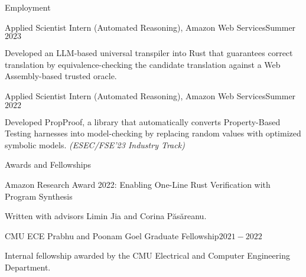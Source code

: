 \documentclass{resume} %
\begin{document}
\begin{rSection}{Employment}

  \begin{rSubsection}{Applied Scientist Intern (Automated Reasoning),
      Amazon Web Services}{Summer $2023$} {}{}
  \item Developed an LLM-based universal transpiler into Rust that
    guarantees correct translation by equivalence-checking the
    candidate translation against a Web Assembly-based trusted oracle.
  \end{rSubsection}

  \begin{rSubsection}{Applied Scientist Intern (Automated Reasoning),
      Amazon Web Services}{Summer $2022$} {}{}
  \item Developed PropProof, a library that automatically converts
    Property-Based Testing harnesses into model-checking by replacing
    random values with optimized symbolic models. \textit{(ESEC/FSE'23 Industry Track)}
  \end{rSubsection}
\end{rSection}


\begin{rSection}{Awards and Fellowships}

  \begin{rSubsection}{Amazon Research Award 2022: Enabling One-Line Rust
      Verification with Program Synthesis}{}{}{}
  \item Written with advisors Limin Jia and Corina P\u{a}s\u{a}reanu.
  \end{rSubsection}

  \begin{rSubsection}{CMU ECE Prabhu and Poonam Goel Graduate
      Fellowship}{$2021 - 2022$}{}{}
  \item Internal fellowship awarded by the CMU Electrical and Computer
    Engineering Department.
  \end{rSubsection}
\end{rSection}
\end{document}
